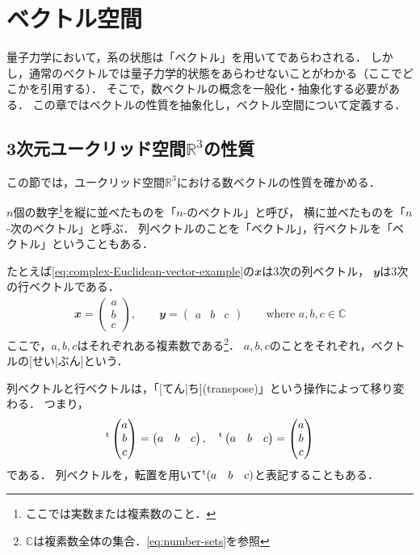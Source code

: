 \documentclass[../sotsu.tex]{subfiles}
\begin{document}
\section{ベクトル空間}
\label{sec:vector-space}

量子力学において，系の状態は「ベクトル」を用いてであらわされる．
しかし，通常のベクトルでは量子力学的状態をあらわせないことがわかる（ここでどこかを引用する）．
そこで，数ベクトルの概念を一般化・抽象化する必要がある．
この章ではベクトルの性質を抽象化し，ベクトル空間について定義する．


\subsection{3次元ユークリッド空間$ℝ^3$の性質}

この節では，ユークリッド空間$ℝ^3$における数ベクトルの性質を確かめる．

$n$個の数字\footnote{ここでは実数または複素数のこと．}を縦に並べたものを「$n$-のベクトル」と呼び，
横に並べたものを「$n$-次のベクトル」と呼ぶ\cite{miyake-lin-2008}．
列ベクトルのことを「ベクトル」，行ベクトルを「ベクトル」ということもある．

たとえば\cref{eq:complex-Euclidean-vector-example}の$𝒙$は3次の列ベクトル，
$𝒚$は3次の行ベクトルである．
\begin{align}
    \label{eq:complex-Euclidean-vector-example}
    𝒙 = 
    \begin{pmatrix}
        a  \\  b  \\  c
    \end{pmatrix}
    , \qquad
    𝒚 = 
    \begin{pmatrix}
        a  &  b  &  c
    \end{pmatrix}
    \qquad 
    \text{where $a, b, c \in ℂ$}
\end{align}
ここで，$a, b, c$はそれぞれある複素数である\footnote{$ℂ$は複素数全体の集合．\cref{eq:number-sets}を参照}．
$a, b, c$のことをそれぞれ，ベクトルの[せい|ぶん]という．

列ベクトルと行ベクトルは，「[てん|ち](transpose)」という操作によって移り変わる．
つまり，
\begin{equation*}
    {}^{\mathrm{t}}\begin{pmatrix}
        a  \\  b  \\  c
    \end{pmatrix}
    =
    \begin{pmatrix}
        a  &  b  &  c
    \end{pmatrix},
    \quad
    {}^{\mathrm{t}}\begin{pmatrix}
        a  &  b  &  c
    \end{pmatrix}
    =
    \begin{pmatrix}
        a  \\  b  \\  c
    \end{pmatrix}
\end{equation*}
である．
列ベクトルを，転置を用いて${}^{\mathrm{t}}(a \quad b \quad c)$と表記することもある．
\end{document}
